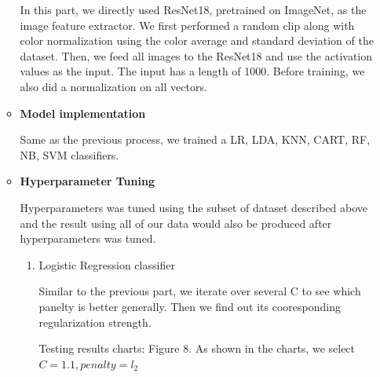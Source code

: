 \documentclass[11.5pt]{article}
\begin{document}
\begin{enumerate}
\begin{itemize}
            In this part, we directly used ResNet18, pretrained on ImageNet, as the image feature extractor. We first performed a random clip along with color normalization using the color average and standard deviation of the dataset. Then, we feed all images to the ResNet18 and use the activation values as the input. The input has a length of 1000. Before training, we also did a normalization on all vectors.
            \item \textbf{Model implementation}

            Same as the previous process, we trained a LR, LDA, KNN, CART, RF, NB, SVM classifiers.
            \item \textbf{Hyperparameter Tuning}
            
            Hyperparameters was tuned using the subset of dataset described above and the result using all of our data would also be produced after hyperparameters was tuned.
            \begin{enumerate}
                \item Logistic Regression classifier

                Similar to the previous part, we iterate over several C to see which panelty is better generally. Then we find out its cooresponding regularization strength. 

                Testing results charts: Figure 8. As shown in the charts, we select $C = 1.1, penalty = l_2$ 


\end{enumerate}
\end{itemize}
\end{enumerate}
\end{document}
